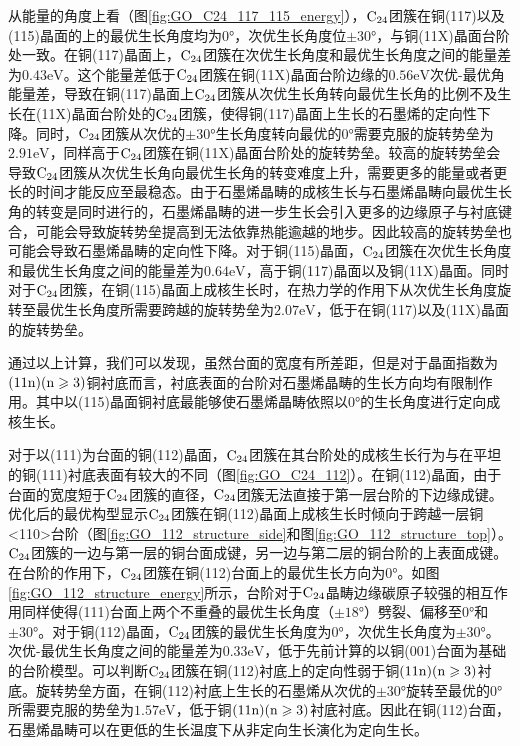         从能量的角度上看（图\ref{fig:GO_C24_117_115_energy}），$\rm{C_{24}}$团簇在铜(117)以及(115)晶面的上的最优生长角度均为$0 \si{\degree}$，次优生长角度位$\pm 30 \si{\degree}$，与铜(11X)晶面台阶处一致。在铜(117)晶面上，$\rm{C_{24}}$团簇在次优生长角度和最优生长角度之间的能量差为$0.43\si{\electronvolt}$。这个能量差低于$\rm{C_{24}}$团簇在铜(11X)晶面台阶边缘的$0.56\si{\electronvolt}$次优-最优角能量差，导致在铜(117)晶面上$\rm{C_{24}}$团簇从次优生长角转向最优生长角的比例不及生长在(11X)晶面台阶处的$\rm{C_{24}}$团簇，使得铜(117)晶面上生长的石墨烯的定向性下降。同时，$\rm{C_{24}}$团簇从次优的$\pm 30 \si{\degree}$生长角度转向最优的$0\si{\degree}$需要克服的旋转势垒为$2.91 \si{\electronvolt}$，同样高于$\rm{C_{24}}$团簇在铜(11X)晶面台阶处的旋转势垒。较高的旋转势垒会导致$\rm{C_{24}}$团簇从次优生长角向最优生长角的转变难度上升，需要更多的能量或者更长的时间才能反应至最稳态。由于石墨烯晶畴的成核生长与石墨烯晶畴向最优生长角的转变是同时进行的，石墨烯晶畴的进一步生长会引入更多的边缘原子与衬底键合，可能会导致旋转势垒提高到无法依靠热能逾越的地步。因此较高的旋转势垒也可能会导致石墨烯晶畴的定向性下降。对于铜(115)晶面，$\rm{C_{24}}$团簇在次优生长角度和最优生长角度之间的能量差为$0.64\si{\electronvolt}$，高于铜(117)晶面以及铜(11X)晶面。同时对于$\rm{C_{24}}$团簇，在铜(115)晶面上成核生长时，在热力学的作用下从次优生长角度旋转至最优生长角度所需要跨越的旋转势垒为$2.07 \si{\electronvolt}$，低于在铜(117)以及(11X)晶面的旋转势垒。
        
        通过以上计算，我们可以发现，虽然台面的宽度有所差距，但是对于晶面指数为$\rm{(11n)(n \geqslant 3)}$铜衬底而言，衬底表面的台阶对石墨烯晶畴的生长方向均有限制作用。其中以(115)晶面铜衬底最能够使石墨烯晶畴依照以$0 \si{\degree}$的生长角度进行定向成核生长。
        
        对于以(111)为台面的铜(112)晶面，$\rm{C_{24}}$团簇在其台阶处的成核生长行为与在平坦的铜(111)衬底表面有较大的不同（图\ref{fig:GO_C24_112}）。在铜(112)晶面，由于台面的宽度短于$\rm{C_{24}}$团簇的直径，$\rm{C_{24}}$团簇无法直接于第一层台阶的下边缘成键。优化后的最优构型显示$\rm{C_{24}}$团簇在铜(112)晶面上成核生长时倾向于跨越一层铜<110>台阶（图\ref{fig:GO_112_structure_side}和图\ref{fig:GO_112_structure_top}）。$\rm{C_{24}}$团簇的一边与第一层的铜台面成键，另一边与第二层的铜台阶的上表面成键。在台阶的作用下，$\rm{C_{24}}$团簇在铜(112)台面上的最优生长方向为$0\si{\degree}$。如图\ref{fig:GO_112_structure_energy}所示，台阶对于$\rm{C_{24}}$晶畴边缘碳原子较强的相互作用同样使得(111)台面上两个不重叠的最优生长角度（$\pm 18 \si{\degree}$）劈裂、偏移至$0\si{\degree}$和$\pm 30 \si{\degree}$。对于铜(112)晶面，$\rm{C_{24}}$团簇的最优生长角度为$0\si{\degree}$，次优生长角度为$\pm 30 \si{\degree}$。次优-最优生长角度之间的能量差为$0.33\si{\electronvolt}$，低于先前计算的以铜(001)台面为基础的台阶模型。可以判断$\rm{C_{24}}$团簇在铜(112)衬底上的定向性弱于铜$\rm{(11n)(n \geqslant 3)}$衬底。旋转势垒方面，在铜(112)衬底上生长的石墨烯从次优的$\pm 30 \si{\degree}$旋转至最优的$0\si{\degree}$所需要克服的势垒为$1.57 \si{\electronvolt}$，低于铜$\rm{(11n)(n \geqslant 3)}$衬底衬底。因此在铜(112)台面，石墨烯晶畴可以在更低的生长温度下从非定向生长演化为定向生长。

